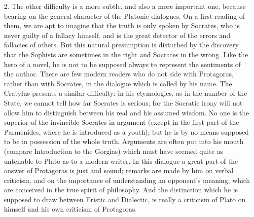 \documentclass[11pt,letter]{article}
\begin{document}
\par  2. The other difficulty is a more subtle, and also a more important one, because bearing on the general character of the Platonic dialogues. On a first reading of them, we are apt to imagine that the truth is only spoken by Socrates, who is never guilty of a fallacy himself, and is the great detector of the errors and fallacies of others. But this natural presumption is disturbed by the discovery that the Sophists are sometimes in the right and Socrates in the wrong. Like the hero of a novel, he is not to be supposed always to represent the sentiments of the author. There are few modern readers who do not side with Protagoras, rather than with Socrates, in the dialogue which is called by his name. The Cratylus presents a similar difficulty: in his etymologies, as in the number of the State, we cannot tell how far Socrates is serious; for the Socratic irony will not allow him to distinguish between his real and his assumed wisdom. No one is the superior of the invincible Socrates in argument (except in the first part of the Parmenides, where he is introduced as a youth); but he is by no means supposed to be in possession of the whole truth. Arguments are often put into his mouth (compare Introduction to the Gorgias) which must have seemed quite as untenable to Plato as to a modern writer. In this dialogue a great part of the answer of Protagoras is just and sound; remarks are made by him on verbal criticism, and on the importance of understanding an opponent's meaning, which are conceived in the true spirit of philosophy. And the distinction which he is supposed to draw between Eristic and Dialectic, is really a criticism of Plato on himself and his own criticism of Protagoras.
\end{document}
